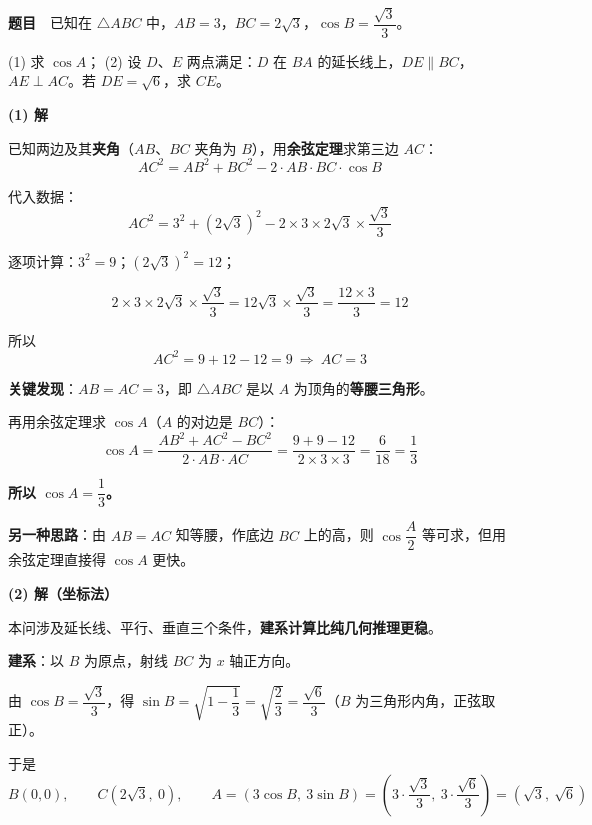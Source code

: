 \par\medskip


\textbf{题目}　已知在 $\triangle ABC$ 中，$AB=3$，$BC=2\sqrt3$，$\cos B=\dfrac{\sqrt3}{3}$。

  (1) 求 $\cos A$；
  (2) 设 $D$、$E$ 两点满足：$D$ 在 $BA$ 的延长线上，$DE\parallel BC$，$AE\perp AC$。若 $DE=\sqrt6$，求 $CE$。

\par\medskip

\textbf{(1) 解}

已知两边及其\textbf{夹角}（$AB$、$BC$ 夹角为 $B$），用\textbf{余弦定理}求第三边 $AC$：
\[AC^2=AB^2+BC^2-2\cdot AB\cdot BC\cdot\cos B\]

代入数据：
\[AC^2=3^2+\left(2\sqrt3\right)^2-2\times3\times2\sqrt3\times\frac{\sqrt3}{3}\]

逐项计算：$3^2=9$；$\left(2\sqrt3\right)^2=12$；

\[2\times3\times2\sqrt3\times\frac{\sqrt3}{3}=12\sqrt3\times\frac{\sqrt3}{3}=\frac{12\times3}{3}=12\]

所以
\[AC^2=9+12-12=9\ \Longrightarrow\ AC=3\]

\textbf{关键发现}：$AB=AC=3$，即 $\triangle ABC$ 是以 $A$ 为顶角的\textbf{等腰三角形}。

再用余弦定理求 $\cos A$（$A$ 的对边是 $BC$）：
\[\cos A=\frac{AB^2+AC^2-BC^2}{2\cdot AB\cdot AC}=\frac{9+9-12}{2\times3\times3}=\frac{6}{18}=\frac13\]

\textbf{所以 $\cos A=\dfrac13$。}

\begin{gktip}
\textbf{另一种思路}：由 $AB=AC$ 知等腰，作底边 $BC$ 上的高，则 $\cos\dfrac{A}{2}$ 等可求，但用余弦定理直接得 $\cos A$ 更快。
\end{gktip}

\par\medskip

\textbf{(2) 解（坐标法）}

本问涉及延长线、平行、垂直三个条件，\textbf{建系计算比纯几何推理更稳}。

\textbf{建系}：以 $B$ 为原点，射线 $BC$ 为 $x$ 轴正方向。

由 $\cos B=\dfrac{\sqrt3}{3}$，得 $\sin B=\sqrt{1-\dfrac13}=\sqrt{\dfrac23}=\dfrac{\sqrt6}{3}$（$B$ 为三角形内角，正弦取正）。

于是
\[B(0,0),\qquad C\left(2\sqrt3,\ 0\right),\qquad A=\left(3\cos B,\ 3\sin B\right)=\left(3\cdot\frac{\sqrt3}{3},\ 3\cdot\frac{\sqrt6}{3}\right)=\left(\sqrt3,\ \sqrt6\right)\]

